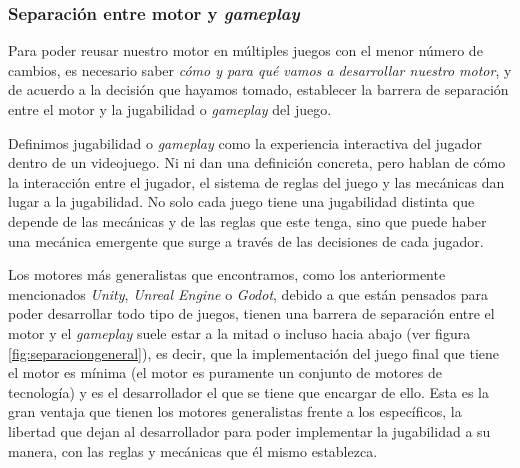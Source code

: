 \subsubsection{Separación entre motor y \textit{gameplay}}
Para poder reusar nuestro motor en múltiples juegos con el menor número de cambios, es necesario saber \textit{cómo y para qué vamos a desarrollar nuestro motor}, y de acuerdo a la decisión que hayamos tomado, establecer la barrera de separación entre el motor y la jugabilidad o \textit{gameplay} del juego.

\medskip

Definimos jugabilidad o \textit{gameplay} como la experiencia interactiva del jugador dentro de un videojuego. Ni \cite{tekinbas2003rules} ni \cite{schell2019art} dan una definición concreta, pero hablan de cómo la interacción entre el jugador, el sistema de reglas del juego y las mecánicas dan lugar a la jugabilidad. No solo cada juego tiene una jugabilidad distinta que depende de las mecánicas y de las reglas que este tenga, sino que puede haber una mecánica emergente que surge a través de las decisiones de cada jugador.

\smallskip


Los motores más generalistas que encontramos, como los anteriormente mencionados \textit{Unity}, \textit{Unreal Engine} o \textit{Godot}, debido a que están pensados para poder desarrollar todo tipo de juegos, tienen una barrera de separación entre el motor y el \textit{gameplay} suele estar a la mitad o incluso hacia abajo (ver figura \ref{fig:separaciongeneral}), es decir, que la implementación del juego final que tiene el motor es mínima (el motor es puramente un conjunto de motores de tecnología) y es el desarrollador el que se tiene que encargar de ello. Esta es la gran ventaja que tienen los motores generalistas frente a los específicos, la libertad que dejan al desarrollador para poder implementar la jugabilidad a su manera, con las reglas y mecánicas que él mismo establezca.


